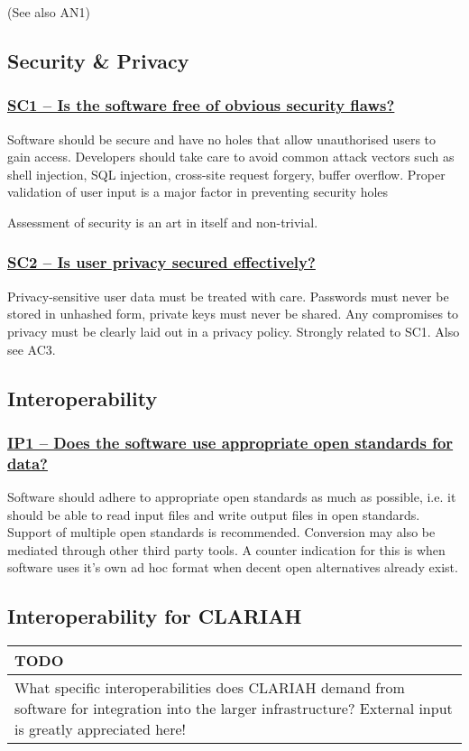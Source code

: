 \documentclass[a4paper,11pt]{article}
\newenvironment{TODO}{
\begin{center}
    \begin{tabular}[h!]{|p{0.8\textwidth}|}
    \hline
    {\bf TODO}\\\hline}
{   \\\hline
    \end{tabular}
\end{center}}
\newcommand{\indicator}[1]{\subsubsection*{\underline{#1}}}
\begin{document}
(See also AN1)

\subsection{Security \& Privacy}

\indicator{SC1 -- Is the software free of obvious security flaws?}

Software should be secure and have no holes that allow unauthorised users to
gain access. Developers should take care to avoid common attack vectors such as
shell injection, SQL injection, cross-site request forgery, buffer overflow.
Proper validation of user input is a major factor in preventing security holes

Assessment of security is an art in itself and non-trivial. 

\indicator{SC2 -- Is user privacy secured effectively?}

Privacy-sensitive user data must be treated with care. Passwords must never be
stored in unhashed form, private keys must never be shared. Any compromises to
privacy must be clearly laid out in a privacy policy.  Strongly related to SC1.
Also see AC3.

\subsection{Interoperability}

\indicator{IP1 -- Does the software use appropriate open standards for data?}

Software should adhere to appropriate open standards as much as possible, i.e.
it should be able to read input files and write output files in open
standards. Support of multiple open standards is recommended. Conversion may
also be mediated through other third party tools. A counter indication for this
is when software uses it's own ad hoc format when decent open alternatives
already exist.

\subsection{Interoperability for CLARIAH}


\begin{TODO} 
What specific interoperabilities does CLARIAH demand from software for
integration into the larger infrastructure?  External input is greatly
appreciated here!
\end{TODO}

\end{document}
